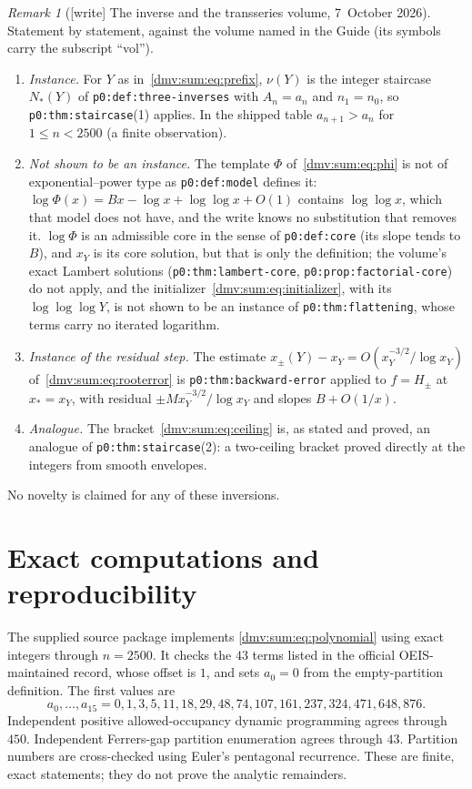 \documentclass[11pt,letterpaper]{article}
\numberwithin{equation}{section}
\theoremstyle{definition}\newtheorem{definition}[theorem]{Definition}
\theoremstyle{remark}\newtheorem{remark}[theorem]{Remark}
\newcommand{\file}[1]{\nolinkurl{#1}}
\begin{document}
\begin{remark}[{[write]} The inverse and the transseries volume, 7~October 2026]\label{dmv:sum:rem:transseries}
Statement by statement, against the volume named in the Guide (its symbols
carry the subscript ``vol'').
\begin{enumerate}[label=(\alph*),leftmargin=*]
\item \emph{Instance.} For $Y$ as in~\eqref{dmv:sum:eq:prefix}, $\nu(Y)$ is
the integer staircase $N_*(Y)$ of \file{p0:def:three-inverses} with
$A_n=a_n$ and $n_1=n_0$, so \file{p0:thm:staircase}(1) applies. In the
shipped table $a_{n+1}>a_n$ for $1\le n<2500$ (a finite observation).
\item \emph{Not shown to be an instance.} The template $\Phi$
of~\eqref{dmv:sum:eq:phi} is not of exponential--power type as
\file{p0:def:model} defines it: $\log\Phi(x)=Bx-\log x+\log\log x+O(1)$
contains $\log\log x$, which that model does not have, and the write knows no
substitution that removes it. $\log\Phi$ is an admissible core in the sense
of \file{p0:def:core} (its slope tends to $B$), and $x_Y$ is its core
solution, but that is only the definition; the volume's exact Lambert
solutions (\file{p0:thm:lambert-core}, \file{p0:prop:factorial-core}) do not
apply, and the initializer~\eqref{dmv:sum:eq:initializer}, with its
$\log\log\log Y$, is not shown to be an instance of
\file{p0:thm:flattening}, whose terms carry no iterated logarithm.
\item \emph{Instance of the residual step.} The estimate
$x_\pm(Y)-x_Y=O(x_Y^{-3/2}/\log x_Y)$ of~\eqref{dmv:sum:eq:rooterror} is
\file{p0:thm:backward-error} applied to $f=H_\pm$ at $x_*=x_Y$, with residual
$\pm Mx_Y^{-3/2}/\log x_Y$ and slopes $B+O(1/x)$.
\item \emph{Analogue.} The bracket~\eqref{dmv:sum:eq:ceiling} is, as stated
and proved, an analogue of \file{p0:thm:staircase}(2): a two-ceiling bracket
proved directly at the integers from smooth envelopes.
\end{enumerate}
No novelty is claimed for any of these inversions.
\end{remark}

\section{Exact computations and reproducibility}\label{dmv:sum:sec:computation}
The supplied source package implements \eqref{dmv:sum:eq:polynomial} using exact integers through $n=2500$. It checks the $43$ terms listed in the official OEIS-maintained record, whose offset is $1$, and sets $a_0=0$ from the empty-partition definition. The first values are
\[
 a_0,\ldots,a_{15}=0,1,3,5,11,18,29,48,74,107,161,237,324,471,648,876.
\]
Independent positive allowed-occupancy dynamic programming agrees through $450$. Independent Ferrers-gap partition enumeration agrees through $43$. Partition numbers are cross-checked using Euler's pentagonal recurrence. These are finite, exact statements; they do not prove the analytic remainders.
\end{document}
